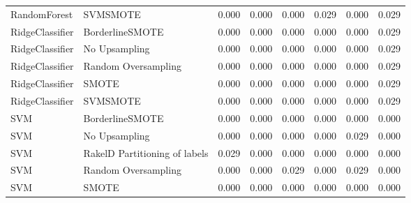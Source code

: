 \begin{tabular}{llllllll}
                   RandomForest &                      SVMSMOTE &     0.000 &                     0.000 &                 0.000 &                  0.029 &                                   0.000 &     0.029 \\
                RidgeClassifier &               BorderlineSMOTE &     0.000 &                     0.000 &                 0.000 &                  0.000 &                                   0.000 &     0.029 \\
                RidgeClassifier &                 No Upsampling &     0.000 &                     0.000 &                 0.000 &                  0.000 &                                   0.000 &     0.029 \\
                RidgeClassifier &           Random Oversampling &     0.000 &                     0.000 &                 0.000 &                  0.000 &                                   0.000 &     0.029 \\
                RidgeClassifier &                         SMOTE &     0.000 &                     0.000 &                 0.000 &                  0.000 &                                   0.000 &     0.029 \\
                RidgeClassifier &                      SVMSMOTE &     0.000 &                     0.000 &                 0.000 &                  0.000 &                                   0.000 &     0.029 \\
                            SVM &               BorderlineSMOTE &     0.000 &                     0.000 &                 0.000 &                  0.000 &                                   0.000 &     0.000 \\
                            SVM &                 No Upsampling &     0.000 &                     0.000 &                 0.000 &                  0.000 &                                   0.029 &     0.000 \\
                            SVM & RakelD Partitioning of labels &     0.029 &                     0.000 &                 0.000 &                  0.000 &                                   0.000 &     0.000 \\
                            SVM &           Random Oversampling &     0.000 &                     0.000 &                 0.029 &                  0.000 &                                   0.029 &     0.000 \\
                            SVM &                         SMOTE &     0.000 &                     0.000 &                 0.000 &                  0.000 &                                   0.000 &     0.000 \\

\end{tabular}
